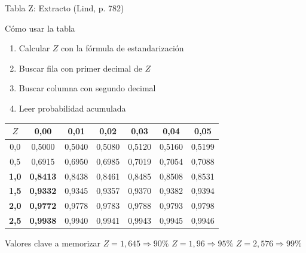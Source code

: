 \documentclass[10pt]{beamer}
\begin{document}
\begin{frame}{Tabla Z: Extracto (Lind, p. 782)}
\begin{block}{Cómo usar la tabla}
\begin{enumerate}
  \item Calcular $Z$ con la fórmula de estandarización
  \item Buscar fila con primer decimal de $Z$
  \item Buscar columna con segundo decimal
  \item Leer probabilidad acumulada
\end{enumerate}
\end{block}

\vspace{0.2cm}
\begin{center}
\footnotesize
\begin{tabular}{c|cccccc}
\toprule
\rowcolor{celeste}
$Z$ & 0{,}00 & 0{,}01 & 0{,}02 & 0{,}03 & 0{,}04 & 0{,}05 \\
\midrule
0{,}0 & 0{,}5000 & 0{,}5040 & 0{,}5080 & 0{,}5120 & 0{,}5160 & 0{,}5199 \\
0{,}5 & 0{,}6915 & 0{,}6950 & 0{,}6985 & 0{,}7019 & 0{,}7054 & 0{,}7088 \\
\rowcolor{verdePastel!30}
\textbf{1{,}0} & \textbf{0{,}8413} & 0{,}8438 & 0{,}8461 & 0{,}8485 & 0{,}8508 & 0{,}8531 \\
\rowcolor{verdePastel!30}
\textbf{1{,}5} & \textbf{0{,}9332} & 0{,}9345 & 0{,}9357 & 0{,}9370 & 0{,}9382 & 0{,}9394 \\
\rowcolor{verdePastel!30}
\textbf{2{,}0} & \textbf{0{,}9772} & 0{,}9778 & 0{,}9783 & 0{,}9788 & 0{,}9793 & 0{,}9798 \\
\rowcolor{verdePastel!30}
\textbf{2{,}5} & \textbf{0{,}9938} & 0{,}9940 & 0{,}9941 & 0{,}9943 & 0{,}9945 & 0{,}9946 \\
\bottomrule
\end{tabular}
\end{center}

\vspace{0.2cm}
\begin{exampleblock}{Valores clave a memorizar}
$Z = 1{,}645 \Rightarrow 90\%$ \quad $Z = 1{,}96 \Rightarrow 95\%$ \quad $Z = 2{,}576 \Rightarrow 99\%$
\end{exampleblock}
\end{frame}
\end{document}
